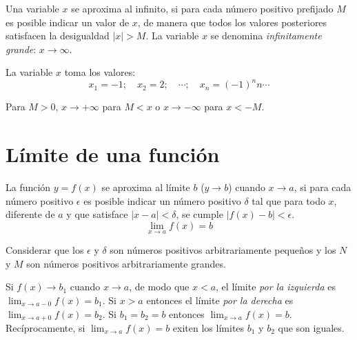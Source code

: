 \begin{definition} 
  Una variable $x$ se aproxima al infinito, si para cada número positivo prefijado $M$ es posible indicar un valor de $x$, de manera que todos los valores posteriores satisfacen la desigualdad $|x| > M$.
  La variable $x$ se denomina \emph{infinitamente grande}: $x \to \infty$.
\end{definition}

\begin{example}
  La variable $x$ toma los valores:
  $$x_1 = -1; \quad x_2 = 2; \quad \cdots; \quad x_n = (-1)^n n \cdots$$
\end{example}

Para $M > 0$, $x \to +\infty$ para $M < x$ o $x \to -\infty$ para $x < -M$.




\section{Límite de una función}

\begin{definition}
  La función $y = f(x)$ se aproxima al límite $b$ ($y \to b$) cuando $x \to a$, si para cada número positivo $\epsilon$ es posible indicar un número positivo $\delta$ tal que para todo $x$, diferente de $a$ y que satisface $|x - a| < \delta$, se cumple $|f(x) - b| < \epsilon$.
  $$\lim_{x \to a} f(x) = b$$
\end{definition}

Considerar que los $\epsilon$ y $\delta$ son números positivos arbitrariamente pequeños y los $N$ y $M$ son números positivos arbitrariamente grandes. %




\begin{remark}
Si \( f(x) \to b_1 \) cuando \( x \to a \), de modo que \( x < a \), el límite \emph{por la izquierda} es \( \lim_{x \to a-0} f(x) = b_1 \). Si \( x > a \) entonces el límite \emph{por la derecha} es \( \lim_{x \to a+0} f(x) = b_2 \). Si \( b_1 = b_2 = b \)  entonces \( \lim_{x \to a} f(x) = b \). Recíprocamente, si \( \lim_{x \to a} f(x) = b \) exiten los límites \( b_1 \) y \( b_2 \) que son iguales.
\end{remark}



